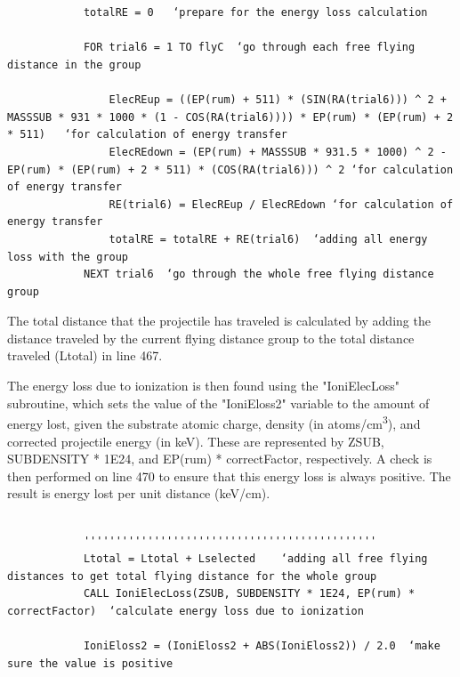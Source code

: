 \documentclass[10pt, reqno]{exam}
\begin{document}
\begin{verbatim}
    
    
            totalRE = 0   ‘prepare for the energy loss calculation 
    
            FOR trial6 = 1 TO flyC  ‘go through each free flying distance in the group
    
                ElecREup = ((EP(rum) + 511) * (SIN(RA(trial6))) ^ 2 + MASSSUB * 931 * 1000 * (1 - COS(RA(trial6)))) * EP(rum) * (EP(rum) + 2 * 511)   ‘for calculation of energy transfer 
                ElecREdown = (EP(rum) + MASSSUB * 931.5 * 1000) ^ 2 - EP(rum) * (EP(rum) + 2 * 511) * (COS(RA(trial6))) ^ 2 ‘for calculation of energy transfer
                RE(trial6) = ElecREup / ElecREdown ‘for calculation of energy transfer
                totalRE = totalRE + RE(trial6)  ‘adding all energy loss with the group
            NEXT trial6  ‘go through the whole free flying distance group 
\end{verbatim}

The total distance that the projectile has traveled is calculated by adding the distance traveled by the current flying distance group to the total distance traveled (Ltotal) in line 467. \par

The energy loss due to ionization is then found using the "IoniElecLoss" subroutine, which sets the value of the "IoniEloss2" variable to the amount of energy lost, given the substrate atomic charge, density (in \si{atoms/cm^3}), and corrected projectile energy (in keV). These are represented by ZSUB, SUBDENSITY * 1E24, and EP(rum) * correctFactor, respectively. A check is then performed on line 470 to ensure that this energy loss is always positive. The result is energy lost per unit distance (\si{keV/cm}).\par

\begin{verbatim}
    
            ''''''''''''''''''''''''''''''''''''''''''''''
            Ltotal = Ltotal + Lselected    ‘adding all free flying distances to get total flying distance for the whole group 
            CALL IoniElecLoss(ZSUB, SUBDENSITY * 1E24, EP(rum) * correctFactor)  ‘calculate energy loss due to ionization 
    
            IoniEloss2 = (IoniEloss2 + ABS(IoniEloss2)) / 2.0  ‘make sure the value is positive 
\end{verbatim}
\end{document}
